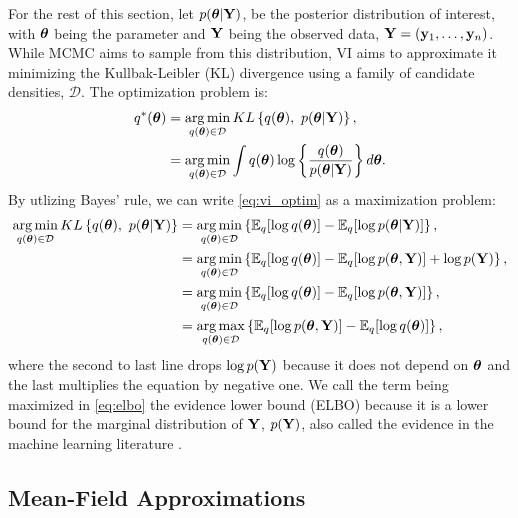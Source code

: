 \documentclass[]{article}
\newcommand{\V}[1]{{\bm{\mathbf{\MakeLowercase{#1}}}}} %
\def\Y{{\bf Y}}
\def\y{{\bf y}}
\def \vtheta{{\V{\theta}}}
\newcommand{\Eq}{\mathbb{E}_{q}}
\DeclareMathOperator*{\argmax}{arg\,max}
\DeclareMathOperator*{\argmin}{arg\,min}
\begin{document}
For the rest of this section, let $p( \vtheta | \Y)$, be the posterior
distribution of interest, with $\vtheta$ being the parameter and $\Y$ being the
observed data, $\Y = (\y_1, \dots, \y_n)$. While MCMC aims to sample from this
distribution, VI aims to approximate it minimizing the Kullbak-Leibler (KL)
divergence using a family of candidate densities, $\mathcal{D}$. The
optimization problem is: 
\begin{align} 
\begin{split} \label{eq:vi_optim}
	q^*(\vtheta) & = \argmin_{q(\vtheta) \in \mathcal{D}} 
		KL \left\{q(\vtheta), \ p(\vtheta | \Y) \right\}, \\
	& = \argmin_{q(\vtheta) \in \mathcal{D}} 
		\int q(\vtheta) \log \left\{ \frac{q(\vtheta)}{p(\vtheta | \Y)} \right\} d\vtheta.
\end{split}
\end{align}
%
By utlizing Bayes' rule, we can write
\eqref{eq:vi_optim} as a maximization problem:
\begin{align}
\begin{split}
\label{eq:elbo}
\argmin_{q(\vtheta) \in \mathcal{D}} KL \left \{ q(\vtheta), \ p(\vtheta | \Y) 
\right\} & = 
\argmin_{q(\vtheta) \in \mathcal{D}}  \left\{ 
\Eq[\log q(\vtheta)] - \Eq[\log p(\vtheta | \Y)] 
\right\}, \\
& =  \argmin_{q(\vtheta) \in \mathcal{D}} \left\{ 
\Eq[\log q(\vtheta)] - \Eq[\log p(\vtheta, \Y)] + \log p(\Y)
\right	\}, \\
& = \argmin_{q(\vtheta) \in \mathcal{D}}  \left\{ 
\Eq[\log q(\vtheta)] - \Eq[\log p(\vtheta, \Y)]
\right\},  \\
& = \argmax_{q(\vtheta) \in \mathcal{D}}  \left\{ 
\Eq[\log p(\vtheta, \Y)] - \Eq[\log q(\vtheta)] 
\right\},
\end{split}
\end{align}
where the second to last line drops $\log p(\Y)$ because it does not depend on
$\vtheta$ and the last multiplies the equation by negative one.  We call the
term being maximized in \eqref{eq:elbo} the evidence lower bound (ELBO) because
it is a lower bound for the marginal distribution of $\Y$, $p(\Y)$, also called
the evidence in the machine learning literature \citep{vbreview}.

\subsection{Mean-Field Approximations} \label{sec:mfvb}
\end{document}
